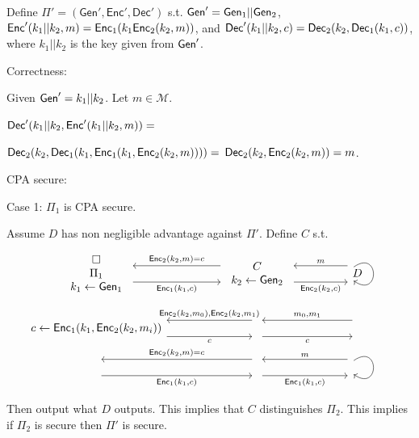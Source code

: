 \documentclass[12pt, letterpaper]{article}
\newcommand{\skcgen}{{\sf Gen}}
\newcommand{\skcenc}{{\sf Enc}}
\newcommand{\skcdec}{{\sf Dec}}
\begin{document}
\begin{problemproof}
    Define $\Pi' = (\mathsf{Gen}', \mathsf{Enc}', \mathsf{Dec}')$ s.t. $\skcgen'=\skcgen_1||\skcgen_2$,
    $\skcenc'(k_1||k_2, m)=\skcenc_1(k_1 \skcenc_2(k_2, m))$, and $\skcdec'(k_1||k_2, c)=\skcdec_2(k_2, \skcdec_1(k_1, c))$, where $k_1||k_2$ is the key given from $\skcgen'$.

    Correctness:

    Given $\skcgen' = k_1||k_2$. Let $m \in \mathcal{M}$.

    $\skcdec'(k_1||k_2, \skcenc'(k_1||k_2, m))=$ 
    
    $\skcdec_2(k_2, \skcdec_1(k_1, \skcenc_1(k_1, \skcenc_2(k_2, m))))=$
    $\skcdec_2(k_2, \skcenc_2(k_2, m))=m$.

    CPA secure:

    Case 1: $\Pi_1$ is CPA secure.

    Assume $D$ has non negligible advantage against $\Pi'$. Define $C$ s.t.
    \[\begin{tikzcd}
	\begin{array}{c} \square \\\Pi_1 \\ k_1 \leftarrow \skcgen_1 \end{array} && \begin{array}{c} C\\ k_2 \overset{}{\leftarrow}\skcgen_2 \end{array} && D \\
	{c \leftarrow \skcenc_1(k_1, \skcenc_2(k_2,m_i)) } && {} && {} \\
	\begin{array}{c} \end{array} && \begin{array}{c} \end{array} && \phantom{D}
	\arrow["{\skcenc_1(k_1, c)}"', shift right=3, from=1-1, to=1-3]
	\arrow["{\skcenc_2(k_2,m)=c}"', shift right=3, from=1-3, to=1-1]
	\arrow["{\skcenc_2(k_2, c)}"', shift right=3, from=1-3, to=1-5]
	\arrow["m"', shift right=3, from=1-5, to=1-3]
	\arrow[shift right=5, from=1-5, to=1-5, loop, in=325, out=35, distance=10mm]
	\arrow["c"', shift right=3, from=2-1, to=2-3]
	\arrow["{\skcenc_2(k_2,m_0), \skcenc_2(k_2,m_1)}"', shift right=3, from=2-3, to=2-1]
	\arrow["c"', shift right=3, from=2-3, to=2-5]
	\arrow["{m_0,m_1}"',shift right=3, from=2-5, to=2-3]
	\arrow["{\skcenc_1(k_1, c)}"', shift right=3, from=3-1, to=3-3]
	\arrow["{\skcenc_2(k_2,m)=c}"', shift right=3, from=3-3, to=3-1]
	\arrow["{\skcenc_1(k_1, c)}"', shift right=3, from=3-3, to=3-5]
	\arrow["m"', shift right=3, from=3-5, to=3-3]
	\arrow[shift right=5, from=3-5, to=3-5, loop, in=325, out=35, distance=10mm]
    \end{tikzcd}\]
    Then output what $D$ outputs. This implies that $C$ distinguishes $\Pi_2$. This implies if $\Pi_2$ is secure then $\Pi'$ is secure.


\end{problemproof}
\end{document}
